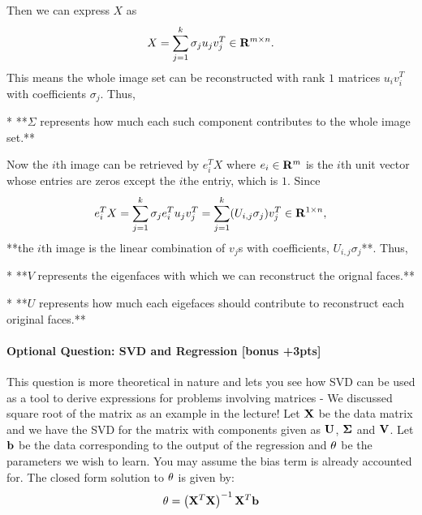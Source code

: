 Then we can express $X$ as
\begin{equation}
X = \sum_{j=1}^k \sigma_j u_j v_j^T \in\mathbf{R}^{m\times n}.
\end{equation}
This means the whole image set can be reconstructed with rank $1$ matrices $u_i v_i^T$ with coefficients $\sigma_j$. Thus,

* **$\Sigma$ represents how much each such component contributes to the whole image set.**

Now the $i$th image can be retrieved by $e_i^T X$ where $e_i\in\mathbf{R}^m$ is the $i$th unit vector whose entries are zeros except the $i$the entriy, which is $1$.
Since
\begin{equation}
e_i^T X = \sum_{j=1}^k \sigma_j e_i^Tu_j v_j^T
= \sum_{j=1}^k (U_{i,j} \sigma_j) v_j^T \in\mathbf{R}^{1\times n},
\end{equation}
**the $i$th image is the linear combination of $v_j$s with coefficients, $U_{i,j} \sigma_j$**. Thus,

* **$V$ represents the eigenfaces with which we can reconstruct the orignal faces.**

* **$U$ represents how much each eigefaces should contribute to reconstruct each original faces.**





\paragraph{Optional Question: SVD and Regression [bonus +3pts]}

This question is more theoretical in nature and lets you see how SVD can be used as a tool to derive expressions for problems involving matrices - We discussed square root of the matrix as an example in the lecture!
Let $\bf{X}$ be the data matrix and we have the SVD for the matrix with components given as $\bf{U}$, $\bf{\Sigma}$ and $\bf{V}$. Let $\bf{b}$ be the data corresponding to the output of the regression and $\bf{\theta}$ be the parameters we wish to learn. You may assume the bias term is already accounted for. The closed form solution to $\bf{\theta}$ is given by:
$$
{\bf{\theta}} = \left({\bf{X}}^T {\bf{X}} \right)^{-1}{\bf{X}}^T {\bf{b}}
$$

